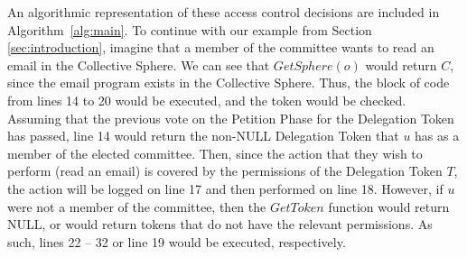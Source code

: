 An algorithmic representation of these access control decisions are included in
Algorithm~\ref{alg:main}. To continue with our example from Section
\ref{sec:introduction}, imagine that a member of the committee wants to read an
email in the Collective Sphere. We can see that $GetSphere(o)$ would return $C$,
since the email program exists in the Collective Sphere. Thus, the block of code
from lines 14 to 20 would be executed, and the token would be checked. Assuming
that the previous vote on the Petition Phase for the Delegation Token has
passed, line 14 would return the non-NULL Delegation Token that $u$ has as a
member of the elected committee. Then, since the action that they wish to
perform (read an email) is covered by the permissions of the Delegation Token
$T$, the action will be logged on line 17 and then performed on line 18.
However, if $u$ were not a member of the committee, then the $GetToken$ function
would return NULL, or would return tokens that do not have the relevant
permissions. As such, lines 22 -- 32 or line 19 would be executed, respectively.

